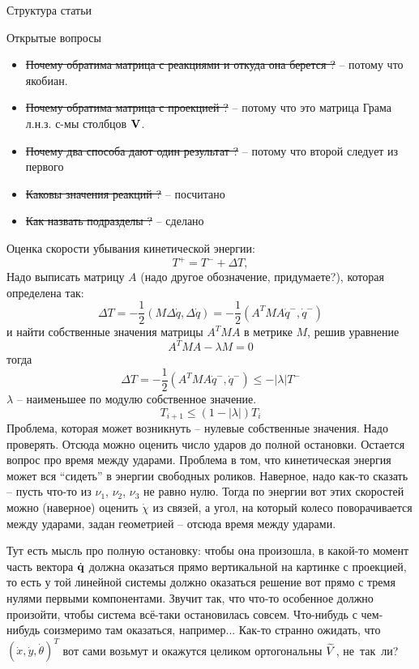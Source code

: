 



{\huge Структура статьи}


\vspace{20pt}

{\huge Открытые вопросы}
\begin{itemize}
    \item \sout{Почему обратима матрица с реакциями и откуда она берется ?} -- потому что якобиан.
    \item \sout{Почему обратима матрица с проекцией ?} -- потому что это матрица Грама л.н.з. с-мы столбцов $\mathbf{V}$.
    \item \sout{Почему два способа дают один результат ?} -- потому что второй следует из первого
    \item \sout{Каковы значения реакций ?} -- посчитано
    \item \sout{Как назвать подразделы ?} -- сделано
\end{itemize}

Оценка скорости убывания кинетической энергии:
$$
T^+ = T^- + \Delta T,
$$
Надо выписать матрицу $A$ (надо другое обозначение, придумаете?), которая определена так:
$$
\Delta T = -\frac12(M\Delta\dot{q},\Delta\dot{q}) = -\frac12(A^T M A\dot{q}^-, \dot{q}^{-})
$$
и найти собственные значения матрицы $A^T M A$ в метрике $M$, решив уравнение
$$
A^T M A - \lambda M = 0
$$
тогда 
$$
\Delta T = -\frac12(A^T M A\dot{q}^-, \dot{q}^{-}) \leq -|\lambda| T^{-}
$$
$\lambda$ -- наименьшее по модулю собственное значение.
$$
T_{i+1}\leq (1-|\lambda|) T_{i}
$$
Проблема, которая может возникнуть -- нулевые собственные значения. Надо проверять.
Отсюда можно оценить число ударов до полной остановки.
Остается вопрос про время между ударами.
Проблема в том, что кинетическая энергия может вся ``сидеть'' в энергии свободных роликов. Наверное, надо как-то сказать -- пусть что-то из $\nu_1$, $\nu_2$, $\nu_3$ не равно нулю. Тогда по энергии вот этих скоростей можно (наверное) оценить $\dot{\chi}$ из связей, а угол, на который колесо поворачивается между ударами, задан геометрией -- отсюда время между ударами.

Тут есть мысль про полную остановку: чтобы она произошла, в какой-то момент часть вектора $\dot{\mathbf{q}}$ должна оказаться прямо вертикальной на картинке с проекцией, то есть у той линейной системы должно оказаться решение вот прямо с тремя нулями первыми компонентами. Звучит так, что что-то особенное должно произойти, чтобы система всё-таки остановилась совсем. Что-нибудь с чем-нибудь соизмеримо там оказаться, например... Как-то странно ожидать, что $(\dot{x}, \dot{y}, \dot{\theta})^T$ вот сами возьмут и окажутся целиком ортогональны $\widetilde{V}$, не~так~ли?

